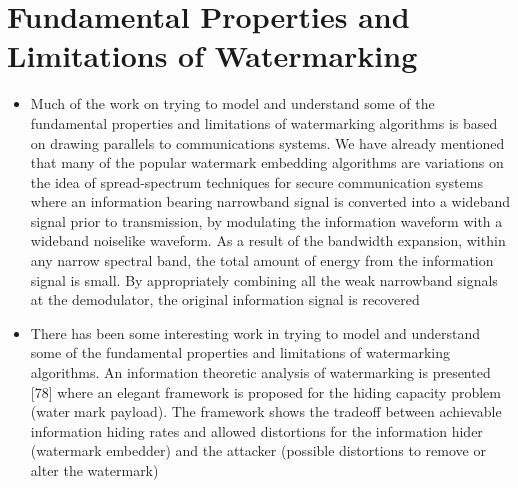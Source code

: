 \documentclass[12pt]{IEeetran}
\begin{document}
\section{Fundamental Properties and Limitations of Watermarking}
\begin{itemize}
\item Much of the work on trying to model and understand
some of the fundamental properties and limitations of
watermarking algorithms is based on drawing parallels to
communications systems. We have already mentioned
that many of the popular watermark embedding algorithms are variations on the idea of spread-spectrum techniques for secure communication systems where an
information bearing narrowband signal is converted into
a wideband signal prior to transmission, by modulating
the information waveform with a wideband noiselike
waveform. As a result of the bandwidth expansion, within
any narrow spectral band, the total amount of energy
from the information signal is small. By appropriately
combining all the weak narrowband signals at the demodulator, the original information signal is recovered

\item There has been some interesting work in trying to
model and understand some of the fundamental properties and limitations of watermarking algorithms. An information theoretic analysis of
watermarking is presented [78] where an elegant framework is proposed for the hiding capacity problem (water￾mark payload). The framework shows the tradeoff
between achievable information hiding rates and allowed
distortions for the information hider (watermark
embedder) and the attacker (possible distortions to remove or alter the watermark)
\end{itemize}
\end{document}
